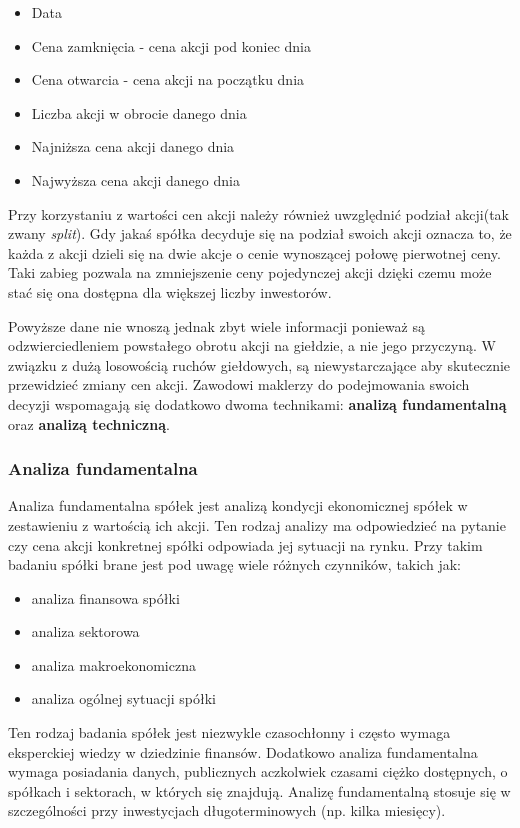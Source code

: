\documentclass[a4paper, twoside, 11pt, openright]{article}
\begin{document}
\begin{itemize}
\item{Data}
\item{Cena zamknięcia} - cena akcji pod koniec dnia
\item{Cena otwarcia} - cena akcji na początku dnia
\item{Liczba akcji w obrocie danego dnia}
\item{Najniższa cena akcji danego dnia}
\item{Najwyższa cena akcji danego dnia}
\end{itemize}

 Przy korzystaniu z wartości cen akcji należy również uwzględnić podział akcji(tak zwany \textit{split}). Gdy jakaś spółka decyduje się na podział swoich akcji oznacza to, że każda z akcji dzieli się na dwie akcje o cenie wynoszącej połowę pierwotnej ceny. Taki zabieg pozwala na zmniejszenie ceny pojedynczej akcji dzięki czemu może stać się ona dostępna dla większej liczby inwestorów. 
 
\bigskip

Powyższe dane nie wnoszą jednak zbyt wiele informacji ponieważ są odzwierciedleniem powstałego obrotu akcji na giełdzie, a nie jego przyczyną. W związku z dużą losowością ruchów giełdowych, są niewystarczające aby skutecznie przewidzieć zmiany cen akcji. Zawodowi maklerzy do podejmowania swoich decyzji wspomagają się dodatkowo dwoma technikami: \textbf{analizą fundamentalną} oraz \textbf{analizą techniczną}.

\subsubsection{Analiza fundamentalna \cite{fundamentalanalysis}}

Analiza fundamentalna spółek jest analizą kondycji ekonomicznej spółek w zestawieniu z wartością ich akcji. Ten rodzaj analizy ma odpowiedzieć na pytanie czy cena akcji konkretnej spółki odpowiada jej sytuacji na rynku. Przy takim badaniu spółki brane jest pod uwagę wiele różnych czynników, takich jak:
\begin{itemize}
\item{analiza finansowa spółki}
\item{analiza sektorowa}
\item{analiza makroekonomiczna}
\item{analiza ogólnej sytuacji spółki}
\end{itemize}

Ten rodzaj badania spółek jest niezwykle czasochłonny i często wymaga eksperckiej wiedzy w dziedzinie finansów. Dodatkowo analiza fundamentalna wymaga posiadania danych, publicznych aczkolwiek czasami ciężko dostępnych, o spółkach i sektorach, w których się znajdują. Analizę fundamentalną stosuje się w szczególności przy inwestycjach długoterminowych (np. kilka miesięcy).
\end{document}
